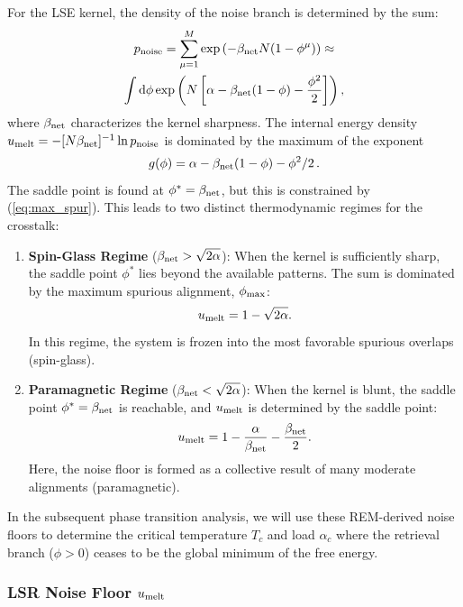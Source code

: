 \documentclass{article}
\newcommand{\dd}{{\mathrm{d}}}
\theoremstyle{plain}
\theoremstyle{definition}
\theoremstyle{remark}
\begin{document}
For the LSE kernel, the density of the noise branch is determined by the sum:
\begin{multline}
    p_{\rm noise} = \sum_{\mu=1}^{M} \exp\left( -\beta_{\rm net} N (1 - \phi^\mu) \right) \approx \\
    \int \dd\phi \exp\left( N \left[ \alpha - \beta_{\rm net}(1 - \phi) - \frac{\phi^2}{2} \right] \right),
\end{multline}
where $\beta_{\rm net}$ characterizes the kernel sharpness. The internal energy density $u_{\rm melt} = - [{N\beta_{\rm net}}]^{-1} \ln p_{\rm noise}$ is dominated by the maximum of the exponent 
\[
g(\phi) = \alpha - \beta_{\rm net}(1 - \phi) - \phi^2/2\,.
\]
The saddle point is found at $\phi^* = \beta_{\rm net}$, but this is constrained by (\ref{eq:max_spur}). This leads to two distinct thermodynamic regimes for the crosstalk:

\begin{enumerate}
    \item \textbf{Spin-Glass Regime} ($\beta_{\rm net} > \sqrt{2\alpha}$): 
    When the kernel is sufficiently sharp, the saddle point $\phi^*$ lies beyond the available patterns. The sum is dominated by the maximum spurious alignment, $\phi_{\rm max}$:
    \begin{equation}
        u_{\rm melt} = 1 - \sqrt{2\alpha}.
    \end{equation}
    In this regime, the system is frozen into the most favorable spurious overlaps (spin-glass).
    
    \item \textbf{Paramagnetic Regime} ($\beta_{\rm net} < \sqrt{2\alpha}$): 
    When the kernel is blunt, the saddle point $\phi^* = \beta_{\rm net}$ is reachable, and $u_{\rm melt}$ is determined by the saddle point:
    \begin{equation}
        u_{\rm melt} = 1 - \frac{\alpha}{\beta_{\rm net}} - \frac{\beta_{\rm net}}{2}.
    \end{equation}
    Here, the noise floor is formed as a collective result of many moderate alignments (paramagnetic).
\end{enumerate}

In the subsequent phase transition analysis, we will use these REM-derived noise floors to determine the critical temperature $T_c$ and load $\alpha_c$ where the retrieval branch ($\phi > 0$) ceases to be the global minimum of the free energy.

\subsubsection{LSR Noise Floor $u_{\rm melt}$}
\end{document}
